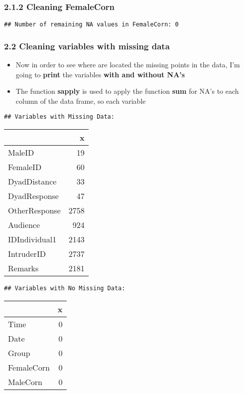 \documentclass[
]{article}
\begin{document}
\hypertarget{cleaning-femalecorn}{%
\subsubsection{2.1.2 Cleaning FemaleCorn}\label{cleaning-femalecorn}}

\begin{verbatim}
## Number of remaining NA values in FemaleCorn: 0
\end{verbatim}

\hypertarget{cleaning-variables-with-missing-data}{%
\subsubsection{2.2 Cleaning variables with missing
data}\label{cleaning-variables-with-missing-data}}

\begin{itemize}
\item
  Now in order to see where are located the missing points in the data,
  I'm going to \textbf{print} the variables \textbf{with and without
  NA's}
\item
  The function \textbf{sapply} is used to apply the function
  \textbf{sum} for NA's to each column of the data frame, so each
  variable
\end{itemize}

\begin{verbatim}
## Variables with Missing Data:
\end{verbatim}

\begin{longtable}[]{@{}lr@{}}
\toprule
& x \\
\midrule
\endhead
MaleID & 19 \\
FemaleID & 60 \\
DyadDistance & 33 \\
DyadResponse & 47 \\
OtherResponse & 2758 \\
Audience & 924 \\
IDIndividual1 & 2143 \\
IntruderID & 2737 \\
Remarks & 2181 \\
\bottomrule
\end{longtable}

\begin{verbatim}
## Variables with No Missing Data:
\end{verbatim}

\begin{longtable}[]{@{}lr@{}}
\toprule
& x \\
\midrule
\endhead
Time & 0 \\
Date & 0 \\
Group & 0 \\
FemaleCorn & 0 \\
MaleCorn & 0 \\
\bottomrule
\end{longtable}
\end{document}
